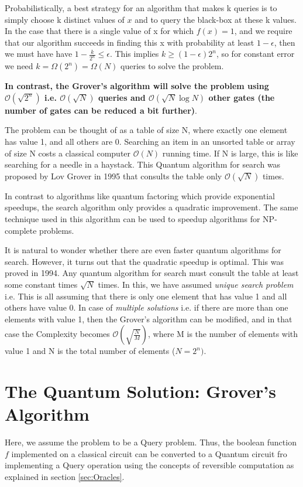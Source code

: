 \documentclass[12pt, oneside]{book}
\theoremstyle{definition}
\theoremstyle{definition}
\theoremstyle{remark}
\begin{document}
Probabilistically, a best strategy for an algorithm that makes k queries is to simply choose k distinct values of $x$ and to query the black-box at these k values. In the case that there is a single value of x for which $f(x)=1$, and we require that our algorithm succeeds in finding this x with probability at least $1-\epsilon$, then we must have have $1-\frac{k}{2^n}\leq \epsilon$. This implies $k\geq (1-\epsilon)2^n$, so for constant error we need $k=\Omega(2^n)=\Omega(N)$ queries to solve the problem.

\textbf{In contrast, the Grover's algorithm will solve the problem using $\mathcal{O}(\sqrt{2^n})$ i.e. $\mathcal{O}(\sqrt{N})$ queries and $\mathcal{O}(\sqrt{N}\log N)$ other gates (the number of gates can be reduced a bit further)}.

\begin{importantnote}
    The problem can be thought of as a table of size N, where exactly one element has value 1, and all others are 0. Searching an item in an unsorted table or array of size N costs a classical computer $\mathcal{O}(N)$ running time. If N is large, this is like searching for a needle in a haystack. This Quantum algorithm for search was proposed by Lov Grover in 1995 that consults the table only $\mathcal{O}(\sqrt{N})$ times.

    In contrast to algorithms like quantum factoring which provide exponential speedups, the search algorithm only provides a quadratic improvement. The same technique used in this algorithm can be used to speedup algorithms for NP-complete problems.

    It is natural to wonder whether there are even faster quantum algorithms for search. However, it turns out that  the quadratic speedup is optimal. This was proved in 1994. Any quantum algorithm for search must consult the table at least some constant times $\sqrt{N}$ times. In this, we have assumed \textit{unique search problem} i.e. This is all assuming that there is only one element that has value 1 and all others have value 0. In case of \textit{multiple solutions} i.e. if there are more than one elements with value 1, then the Grover's algorithm can be modified, and in that case the Complexity becomes $\mathcal{O}(\sqrt{\frac{N}{M}})$, where M is the number of elements with value 1 and N is the total number of elements ($N=2^n)$.
\end{importantnote}
\section{The Quantum Solution: Grover's Algorithm}
Here, we assume the problem to be a Query problem. Thus, the boolean function $f$ implemented on a classical circuit can be converted to a Quantum circuit fro implementing a Query operation using the concepts of reversible computation as explained in section \ref{sec:Oracles}.
\end{document}
